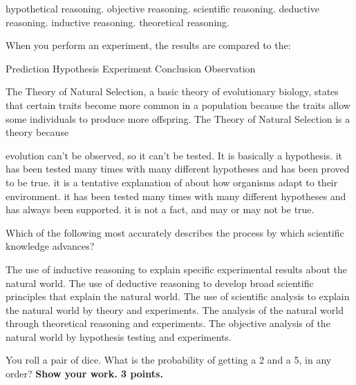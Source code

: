 \begin{choices}
\choice hypothetical reasoning.
\choice objective reasoning.
\choice scientific reasoning.
\choice deductive reasoning.
\correctchoice inductive reasoning.
\choice theoretical reasoning.
\end{choices}

\newpage

\question
When you perform an experiment, the results are compared to the:

\begin{choices}
\correctchoice Prediction
\choice Hypothesis
\choice Experiment
\choice Conclusion
\choice Observation 
\end{choices}

\question
The Theory of Natural Selection, a basic theory of evolutionary biology, states that certain traits become more common in a population because the traits allow some individuals to produce more offspring. The Theory of Natural Selection is a theory because

\begin{choices}
\choice evolution can't be observed, so it can't be tested. It is basically a hypothesis.
\choice it has been tested many times with many different hypotheses and has been proved to be true.
\choice it is a tentative explanation of about how organisms adapt to their environment.
\correctchoice it has been tested many times with many different hypotheses and has always been supported.
\choice it is not a fact, and may or may not be true.
\end{choices}

\question
Which of the following most accurately describes the process by which scientific knowledge advances? 

\begin{choices}
\choice The use of inductive reasoning to explain specific experimental results about the natural world.
\choice The use of deductive reasoning to develop broad scientific principles that explain the natural world.
\choice The use of scientific analysis to explain the natural world by theory and experiments.
\choice The analysis of the natural world through theoretical reasoning and experiments.
\correctchoice The objective analysis of the natural world by hypothesis testing and experiments.
\end{choices}

\question
You roll a pair of dice.  What is the probability of getting a 2 and a 5, in any order? \textbf{Show your work.  3 points.}

